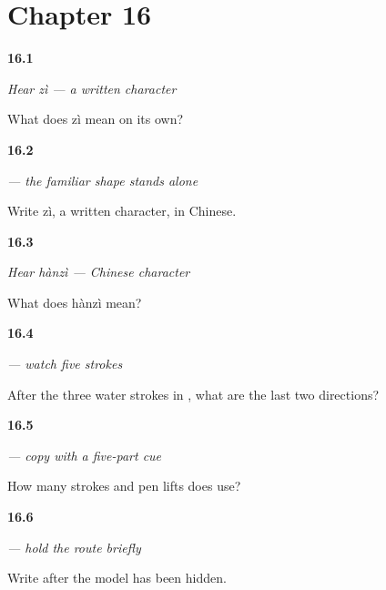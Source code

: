 \section*{Chapter 16}

\noindent\begin{minipage}[t]{\linewidth}
\raggedright
\hypertarget{review-ZH-C16-hear-zi-meaning}{\textbf{16.1}} \emph{Hear \emph{zì} — a written character}\par
\small What does zì mean on its own?
\end{minipage}\par\medskip

\noindent\begin{minipage}[t]{\linewidth}
\raggedright
\hypertarget{review-ZH-C16-zi-write}{\textbf{16.2}} \emph{ — the familiar shape stands alone}\par
\small Write zì, a written character, in Chinese.
\end{minipage}\par\medskip

\noindent\begin{minipage}[t]{\linewidth}
\raggedright
\hypertarget{review-ZH-C16-hear-hanzi-meaning}{\textbf{16.3}} \emph{Hear \emph{hànzì} — Chinese character}\par
\small What does hànzì mean?
\end{minipage}\par\medskip

\noindent\begin{minipage}[t]{\linewidth}
\raggedright
\hypertarget{review-ZH-W16-han-observe-order}{\textbf{16.4}} \emph{ — watch five strokes}\par
\small After the three water strokes in , what are the last two directions?
\end{minipage}\par\medskip

\noindent\begin{minipage}[t]{\linewidth}
\raggedright
\hypertarget{review-ZH-W16-han-guided-count}{\textbf{16.5}} \emph{ — copy with a five-part cue}\par
\small How many strokes and pen lifts does  use?
\end{minipage}\par\medskip

\noindent\begin{minipage}[t]{\linewidth}
\raggedright
\hypertarget{review-ZH-W16-han-delayed-check}{\textbf{16.6}} \emph{ — hold the route briefly}\par
\small Write  after the model has been hidden.
\end{minipage}\par\medskip

